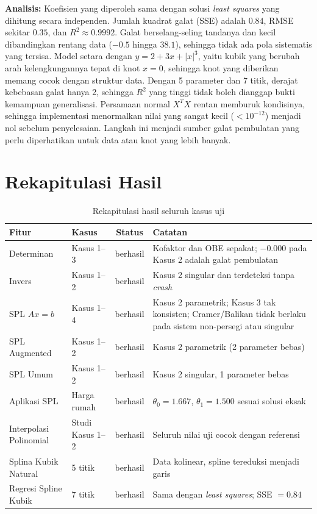 \documentclass[12pt,a4paper]{report}
\begin{document}
\textbf{Analisis:} Koefisien yang diperoleh sama dengan solusi \emph{least squares} yang dihitung secara independen. Jumlah kuadrat galat (SSE) adalah $0.84$, RMSE sekitar $0.35$, dan $R^2\approx 0.9992$. Galat berselang-seling tandanya dan kecil dibandingkan rentang data ($-0.5$ hingga $38.1$), sehingga tidak ada pola sistematis yang tersisa. Model setara dengan $y=2+3x+|x|^3$, yaitu kubik yang berubah arah kelengkungannya tepat di knot $x=0$, sehingga knot yang diberikan memang cocok dengan struktur data. Dengan 5 parameter dan 7 titik, derajat kebebasan galat hanya 2, sehingga $R^2$ yang tinggi tidak boleh dianggap bukti kemampuan generalisasi. Persamaan normal $X^TX$ rentan memburuk kondisinya, sehingga implementasi menormalkan nilai yang sangat kecil ($<10^{-12}$) menjadi nol sebelum penyelesaian. Langkah ini menjadi sumber galat pembulatan yang perlu diperhatikan untuk data atau knot yang lebih banyak.

\section{Rekapitulasi Hasil}
 
\begin{table}[H]
    \centering
    \caption{Rekapitulasi hasil seluruh kasus uji}
    \begin{tabular}{|l|l|c|p{5.5cm}|}
        \hline
        \textbf{Fitur} & \textbf{Kasus} & \textbf{Status} & \textbf{Catatan} \\
        \hline
        Determinan & Kasus 1--3 & berhasil & Kofaktor dan OBE sepakat; $-0.000$ pada Kasus 2 adalah galat pembulatan \\
        Invers & Kasus 1--2 & berhasil & Kasus 2 singular dan terdeteksi tanpa \emph{crash} \\
        SPL $Ax=b$ & Kasus 1--4 & berhasil & Kasus 2 parametrik; Kasus 3 tak konsisten; Cramer/Balikan tidak berlaku pada sistem non-persegi atau singular \\
        SPL Augmented & Kasus 1--2 & berhasil & Kasus 2 parametrik (2 parameter bebas) \\
        SPL Umum & Kasus 1--2 & berhasil & Kasus 2 singular, 1 parameter bebas \\
        Aplikasi SPL & Harga rumah & berhasil & $\theta_0=1.667$, $\theta_1=1.500$ sesuai solusi eksak \\
        Interpolasi Polinomial & Studi Kasus 1--2 & berhasil & Seluruh nilai uji cocok dengan referensi \\
        Splina Kubik Natural & 5 titik & berhasil & Data kolinear, spline tereduksi menjadi garis \\
        Regresi Spline Kubik & 7 titik & berhasil & Sama dengan \emph{least squares}; SSE $=0.84$ \\
        \hline
    \end{tabular}
\end{table}
\end{document}

